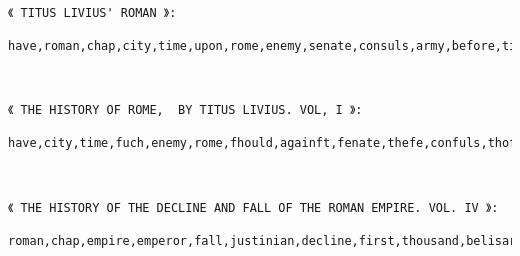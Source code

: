 \documentclass[11pt]{article}
\begin{document}
    \begin{center}
    \end{center}
    { \hspace*{\fill} \\}
    
    \begin{Verbatim}[commandchars=\\\{\}]
《 TITUS LIVIUS' ROMAN 》:
 have,roman,chap,city,time,upon,rome,enemy,senate,consuls,army,before,titus,history,consul,book,camp,country,livius,volsci

    \end{Verbatim}

    \begin{center}
    \end{center}
    { \hspace*{\fill} \\}
    
    \begin{Verbatim}[commandchars=\\\{\}]
《 THE HISTORY OF ROME,  BY TITUS LIVIUS. VOL, I 》:
 have,city,time,fuch,enemy,rome,fhould,againft,fenate,thefe,confuls,thofe,fame,roman,firft,conful,mould,book,camp,year

    \end{Verbatim}

    \begin{center}
    \end{center}
    { \hspace*{\fill} \\}
    
    \begin{Verbatim}[commandchars=\\\{\}]
《 THE HISTORY OF THE DECLINE AND FALL OF THE ROMAN EMPIRE. VOL. IV 》:
 roman,chap,empire,emperor,fall,justinian,decline,first,thousand,belisarius,rome,italy,reign,constantinople,city,death,king,name,palace,general

    \end{Verbatim}

    \begin{center}
    \end{center}
    { \hspace*{\fill} \\}
    
\end{document}
